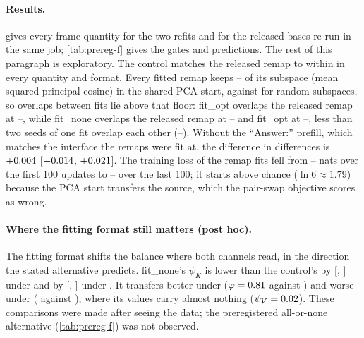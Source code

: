 \paragraph{Results.}  gives every frame quantity for the two refits and for the released bases re-run in the same job; \cref{tab:prereg-f} gives the gates and predictions. The rest of this paragraph is exploratory. The control matches the released remap to within  in every quantity and format. Every fitted remap keeps -- of its subspace (mean squared principal cosine) in the shared PCA start, against  for random subspaces, so overlaps between fits lie above that floor: fit\_opt overlaps the released remap at --, while fit\_none overlaps the released remap at -- and fit\_opt at --, less than two seeds of one fit overlap each other (--). Without the ``Answer:'' prefill, which matches the interface the remaps were fit at, the difference in differences is $+0.004{}$ [$-0.014{}$, $+0.021{}$]. The training loss of the remap fits fell from -- nats over the first 100 updates to -- over the last 100; it starts above chance ($\ln 6 \approx 1.79$) because the PCA start transfers the source, which the pair-swap objective scores as wrong.

\paragraph{Where the fitting format still matters (post hoc).} The fitting format shifts the balance where both channels read, in the direction the stated alternative predicts. fit\_none's $\psi_K$ is lower than the control's by  [, ] under \fmtOpt{} and by  [, ] under \fmtPost{}. It transfers better under \fmtNone{} ($\varphi = 0.81{}$ against \phiNoneRefOpt{}) and worse under \fmtLetter{} (\phiLetterRefNone{} against \phiLetterRefOpt{}), where its values carry almost nothing ($\psi_V = 0.02{}$). These comparisons were made after seeing the data; the preregistered all-or-none alternative (\cref{tab:prereg-f}) was not observed.

\begin{table}[!ht]
\centering
\footnotesize
\caption{\textbf{Refit remaps in the frames of \citet{anonymous2026fitted}} (Mistral-Small-24B, ``Answer:'' prefill). fit\_none: refit under \fmtNone{}; fit\_opt: refit under \fmtOpt{} with the same code; released: the released bases, re-run in the same job. All fits share one PCA control P. $n = 96$ cores, three fits averaged within core; 95\% core bootstrap.}
\label{tab:refit}
{\setlength{\tabcolsep}{4pt}}
\end{table}

